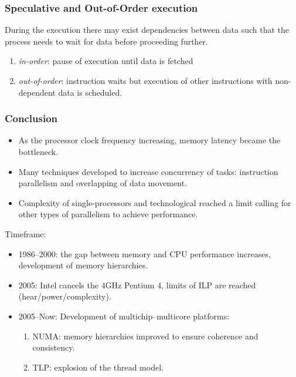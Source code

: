 \begin{frame}
  \frametitle{Speculative and Out-of-Order execution}

During the execution there may exist dependencies between data such that the process needs to wait for data before proceeding further.

\medskip
\begin{enumerate}
\item \textit{in-order}: pause of execution until data is fetched
\item \textit{out-of-order}: instruction waits but execution of other instructions with non-dependent data is scheduled.
\end{enumerate}

\end{frame}

\begin{frame}
  \frametitle{Conclusion}
  \begin{itemize}
  \item As the processor clock frequency increasing, memory latency became the bottleneck.
  \item Many techniques developed to increase concurrency of tasks: instruction parallelism and overlapping of data movement.
  \item Complexity of single-processors and technological reached a limit calling for other types of parallelism to achieve performance.
  \end{itemize}

Timeframe:
  \begin{itemize}
  \item 1986--2000: the gap between memory and CPU performance increases, development of memory hierarchies. 
  \item 2005: Intel cancels the $4$GHz Pentium 4, limits of ILP are reached (hear/power/complexity).
  \item 2005--Now: Development of multichip--multicore platforms:
\begin{enumerate}
\item NUMA: memory hierarchies improved to ensure coherence and consistency.
\item TLP: explosion of the thread model.
\end{enumerate}
  \end{itemize}

\end{frame}


